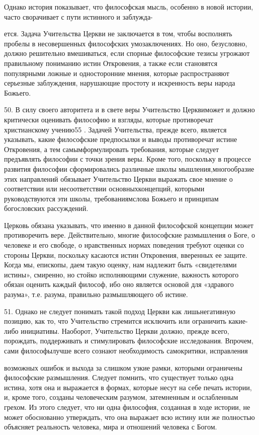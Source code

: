 \documentclass[a5paper,10pt]{article}
\begin{document}
Однако история показывает, что философская мысль, особенно в новой истории,
часто сворачивает с пути истинного и заблужда-

ется. Задача Учительства Церкви не заключается в том, чтобы восполнять пробелы
в несовершенных философских умозаключениях. Но оно, безусловно, должно
решительно вмешиваться, если спорные философские тезисы угрожают правильному
пониманию истин Откровения, а также если становятся популярными ложные и
односторонние мнения, которые распространяют серьезные заблуждения, нарушающие
простоту и искренность веры народа Божьего.

50. В силу своего авторитета и в свете веры Учительство Церквиможет и должно
критически оценивать философию и взгляды, которые противоречат христианскому
учению55 . Задачей Учительства, прежде всего, является указывать, какие
философские предпосылки и выводы противоречат истине Откровения, а тем
самымформулировать требования, которые следует предъявлять философии с точки
зрения веры. Кроме того, поскольку в процессе развития философии сформировались
различные школы мышления,многообразие этих направлений обязывает Учительство
Церкви выражать свое мнение о соответствии или несоответствии
основныхконцепций, которыми руководствуются эти школы, требованиямслова Божьего
и принципам богословских рассуждений.

Церковь обязана указывать, что именно в данной философской концепции может
противоречить вере. Действительно, многие философские размышления о Боге, о
человеке и его свободе, о нравственных нормах поведения требуют оценки со
стороны Церкви, поскольку касаются истин Откровения, вверенных ее защите. Когда
мы, епископы, даем такую оценку, нам надлежит быть «свидетелями истины»,
смиренно, но стойко исполняющими служение, важность которого обязан оценить
каждый философ, ибо оно является основой для «здравого разума», т.е. разума,
правильно размышляющего об истине.

51. Однако не следует понимать такой подход Церкви как лишьнегативную позицию,
как то, что Учительство стремится исключить или ограничить какие-либо
инициативы. Наоборот, Учительство Церкви должно, прежде всего, порождать,
поддерживать и стимулировать философские исследования. Впрочем, сами
философылучше всего сознают необходимость самокритики, исправления

возможных ошибок и выхода за слишком узкие рамки, которыми ограничены
философские размышления. Следует помнить, что существует только одна истина,
хотя она и выражается в формах, которые несут на себе печать истории, и, кроме
того, созданы человеческим разумом, затемненным и ослабленным грехом. Из этого
следует, что ни одна философия, созданная в ходе истории, не может обоснованно
утверждать, что она выражает всю истину или же полностью объясняет реальность
человека, мира и отношений человека с Богом.
\end{document}
